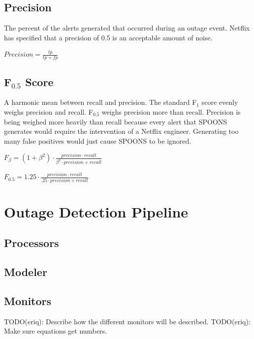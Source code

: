 \documentclass[12pt]{ucthesis}
\begin{document}
\subsection{Precision}
The percent of the alerts generated that occurred during an outage event.
Netflix has specified that a precision of 0.5 is an acceptable amount of noise.
\begin{center}
   $Precision = \frac{tp}{tp + fp}$
\end{center}

\subsection{F$_{0.5}$ Score}
A harmonic mean between recall and precision. The standard F$_{1}$ score evenly weighs precision and recall.
F$_{0.5}$ weighs precision more than recall. Precision is being weighed more heavily than recall because
every alert that SPOONS generates would require the intervention of a Netflix engineer. Generating too many
false positives would just cause SPOONS to be ignored.
\begin{center}
   $F_{\beta} = (1 + \beta^{2}) \cdot \frac{precision \cdot recall}{\beta^{2} \cdot precision + recall}$
\end{center}
\begin{center}
   $F_{0.5} = 1.25 \cdot \frac{precision \cdot recall}{.25 \cdot precision + recall}$
\end{center}

\section{Outage Detection Pipeline}
\label{outage-detection-pipeline}

\subsection{Processors}
\label{outage-detection-processors}

\subsection{Modeler}
\label{outage-detection-modeler}

\subsection{Monitors}
\label{outage-detection-monitors}
TODO(eriq): Describe how the different monitors will be described.
TODO(eriq): Make sure equations get numbers.
\end{document}
